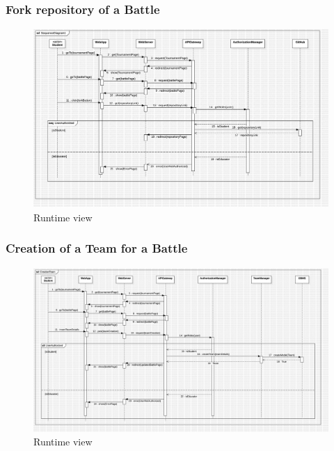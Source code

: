 \subsubsection*{Fork repository of a Battle}
\begin{figure}[H]
    \centering
    \includegraphics[width=\textwidth]{Diagrams/ForkRepositorySD.jpg}
    \caption{Runtime view}
\label{fig:runtime_view}
\end{figure}

\subsubsection*{Creation of a Team for a Battle}
\begin{figure}[H]
    \centering
    \includegraphics[width=\textwidth]{Diagrams/CreationTeamSD.jpg}
    \caption{Runtime view}
\label{fig:runtime_view}
\end{figure}